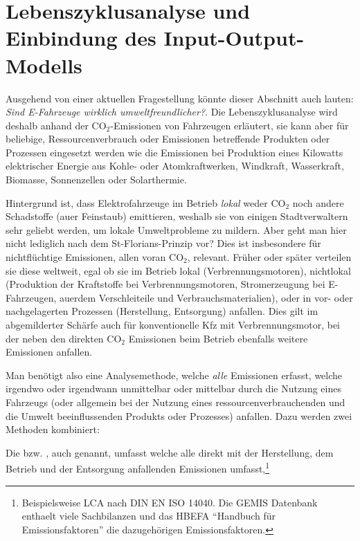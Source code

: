 
\section{\label{sec:LCA-IOM}Lebenszyklusanalyse und Einbindung des
  Input-Output-Modells}


Ausgehend von einer aktuellen Fragestellung k\"onnte dieser Abschnitt
auch lauten: \textit{Sind E-Fahrzeuge wirklich
  umweltfreundlicher?}. Die Lebenszyklusanalyse wird deshalb anhand
der CO$_2$-Emissionen von Fahrzeugen erl\"autert, sie kann aber f\"ur
beliebige, Ressourcenverbrauch oder Emissionen betreffende
Produkten oder Prozessen eingesetzt werden wie die Emissionen bei Produktion
eines Kilowatts elektrischer Energie aus Kohle- oder Atomkraftwerken,
Windkraft, Wasserkraft, Biomasse, Sonnenzellen oder Solarthermie.

Hintergrund ist, dass
Elektrofahrzeuge im Betrieb \emph{lokal} weder CO$_2$ noch
andere Schadstoffe (au\3er Feinstaub) emittieren, weshalb sie von einigen
Stadtverwaltern sehr geliebt werden, um lokale Umweltprobleme zu
mildern.  Aber geht man hier nicht lediglich nach dem
St-Florians-Prinzip vor? Dies ist insbesondere f\"ur nichtfl\"uchtige
Emissionen, allen voran CO$_2$, relevant. Fr\"uher oder sp\"ater
verteilen sie diese weltweit, egal ob sie im Betrieb lokal
(Verbrennungsmotoren), nichtlokal (Produktion der Kraftstoffe bei Verbrennungsmotoren,
Stromerzeugung bei E-Fahrzeugen, au\3erdem Verschlei\3teile und
Verbrauchsmaterialien), oder in 
vor- oder nachgelagerten Prozessen (Herstellung, Entsorgung)
anfallen. Dies gilt im abgemilderter Sch\"arfe auch f\"ur
konventionelle Kfz mit Verbrennungsmotor, bei der neben den direkten CO$_2$
Emissionen beim Betrieb ebenfalls weitere Emissionen anfallen. 

Man ben\"otigt also eine Analysemethode, welche \emph{alle} Emissionen
erfasst, welche irgendwo oder irgendwann unmittelbar oder mittelbar
durch die Nutzung eines Fahrzeugs (oder allgemein bei der Nutzung
eines ressourcenverbrauchenden und die Umwelt beeinflussenden
Produkts oder Prozesses) anfallen. Dazu werden zwei Methoden
kombiniert:
\bi
\item Die  bzw. 
, auch 
genannt, umfasst  welche alle direkt mit der
  Herstellung, dem Betrieb und der Entsorgung anfallenden Emissionen
  umfasst,\footnote{Beispielsweise LCA nach DIN EN ISO 14040. Die
  GEMIS Datenbank enthaelt viele Sachbilanzen und das HBEFA ``Handbuch
  f\"ur Emissionsfaktoren'' die dazugeh\"origen Emissionsfaktoren.}
% 

